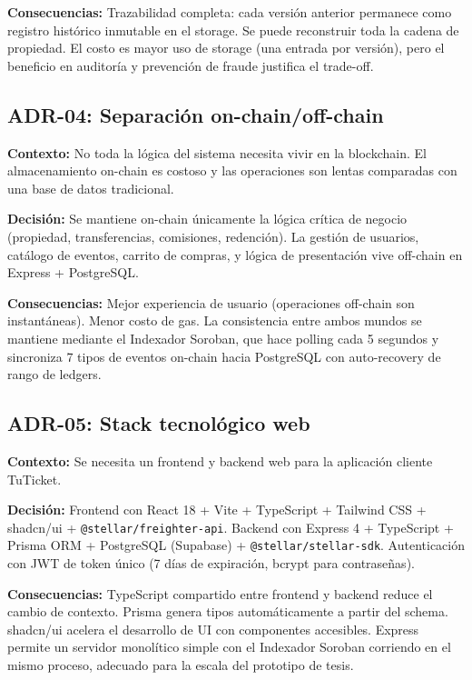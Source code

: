 \documentclass[12pt,oneside]{article}
\begin{document}
\textbf{Consecuencias:} Trazabilidad completa: cada versión anterior permanece como registro histórico inmutable en el storage. Se puede reconstruir toda la cadena de propiedad. El costo es mayor uso de storage (una entrada por versión), pero el beneficio en auditoría y prevención de fraude justifica el trade-off.

\subsection{ADR-04: Separación on-chain/off-chain}

\textbf{Contexto:} No toda la lógica del sistema necesita vivir en la blockchain. El almacenamiento on-chain es costoso y las operaciones son lentas comparadas con una base de datos tradicional.

\textbf{Decisión:} Se mantiene on-chain únicamente la lógica crítica de negocio (propiedad, transferencias, comisiones, redención). La gestión de usuarios, catálogo de eventos, carrito de compras, y lógica de presentación vive off-chain en Express + PostgreSQL.

\textbf{Consecuencias:} Mejor experiencia de usuario (operaciones off-chain son instantáneas). Menor costo de gas. La consistencia entre ambos mundos se mantiene mediante el Indexador Soroban, que hace polling cada 5 segundos y sincroniza 7 tipos de eventos on-chain hacia PostgreSQL con auto-recovery de rango de ledgers.

\subsection{ADR-05: Stack tecnológico web}

\textbf{Contexto:} Se necesita un frontend y backend web para la aplicación cliente TuTicket.

\textbf{Decisión:} Frontend con React 18 + Vite + TypeScript + Tailwind CSS + shadcn/ui + \texttt{@stellar/freighter-api}. Backend con Express 4 + TypeScript + Prisma ORM + PostgreSQL (Supabase) + \texttt{@stellar/stellar-sdk}. Autenticación con JWT de token único (7 días de expiración, bcrypt para contraseñas).

\textbf{Consecuencias:} TypeScript compartido entre frontend y backend reduce el cambio de contexto. Prisma genera tipos automáticamente a partir del schema. shadcn/ui acelera el desarrollo de UI con componentes accesibles. Express permite un servidor monolítico simple con el Indexador Soroban corriendo en el mismo proceso, adecuado para la escala del prototipo de tesis.
\end{document}

